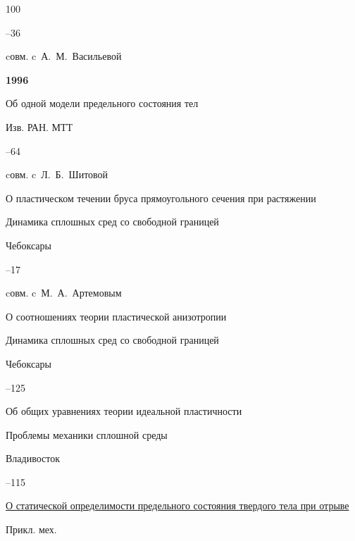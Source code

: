 \begin{thebibliography}{100}

–36 

\miscnote cовм. c~А.~М.~Васильевой



\item[] \centerline{\bf 1996}






\paper Об одной модели предельного состояния тел 

\jour Изв. РАН. МТТ



–64 

\miscnote cовм. c~Л.~Б.~Шитовой




\paper О пластическом течении бруса прямоугольного сечения при растяжении 

\inbook Динамика сплошных сред со свободной границей

\publaddr Чебоксары


–17 

\miscnote cовм. c~М.~А.~Артемовым




\paper  О соотношениях теории пластической анизотропии 

\inbook Динамика сплошных сред со свободной границей

\publaddr Чебоксары


–125




\paper Об общих уравнениях теории идеальной пластичности 

\inbook Проблемы механики сплошной среды

\publaddr Владивосток


–115




\paper \href{https://zbmath.org/?q=an:0925.70088}{О статической определимости предельного состояния твердого тела при отрыве}

\jour Прикл. мех.


\end{thebibliography}
